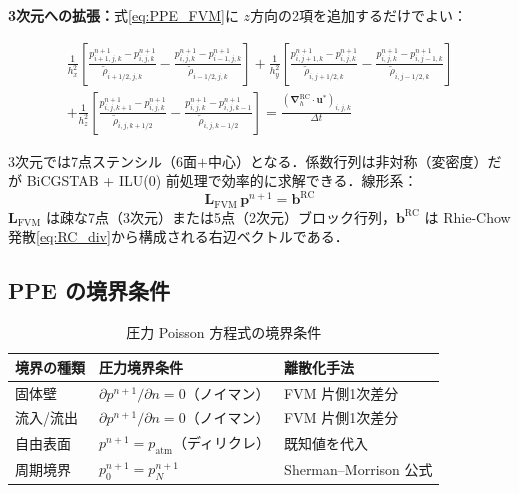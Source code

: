 \documentclass[12pt, a4paper, titlepage]{article}
\newcommand{\jp}[1]{{\normalfont\jpfont #1}}
\newcommand{\bu}{\bm{u}}
\newcommand{\bnabla}{\bm{\nabla}}
\begin{document}
\jp{\textbf{3次元への拡張：}式\eqref{eq:PPE_FVM}に $z$方向の2項を追加するだけでよい：}
\begin{tcolorbox}[mybox, title={\jp{FVM 変密度 PPE（3次元，7点ステンシル）}}]
\begin{multline}
  \frac{1}{h_x^2}\!\left[\frac{p^{n+1}_{i+1,j,k}-p^{n+1}_{i,j,k}}{\tilde\rho_{i+1/2,j,k}}-\frac{p^{n+1}_{i,j,k}-p^{n+1}_{i-1,j,k}}{\tilde\rho_{i-1/2,j,k}}\right]
  + \frac{1}{h_y^2}\!\left[\frac{p^{n+1}_{i,j+1,k}-p^{n+1}_{i,j,k}}{\tilde\rho_{i,j+1/2,k}}-\frac{p^{n+1}_{i,j,k}-p^{n+1}_{i,j-1,k}}{\tilde\rho_{i,j-1/2,k}}\right]\\
  + \frac{1}{h_z^2}\!\left[\frac{p^{n+1}_{i,j,k+1}-p^{n+1}_{i,j,k}}{\tilde\rho_{i,j,k+1/2}}-\frac{p^{n+1}_{i,j,k}-p^{n+1}_{i,j,k-1}}{\tilde\rho_{i,j,k-1/2}}\right]
  = \frac{(\bnabla_h^{\mathrm{RC}}\!\cdot\bu^*)_{i,j,k}}{\Delta t}
  \label{eq:PPE_FVM_3D}
\end{multline}
\end{tcolorbox}
\jp{3次元では7点ステンシル（6面$+$中心）となる．係数行列は非対称（変密度）だが
BiCGSTAB + ILU(0) 前処理で効率的に求解できる．線形系：}
\begin{equation}
  \bm{L}_{\mathrm{FVM}}\,\bm{p}^{n+1} = \bm{b}^{\mathrm{RC}}
  \label{eq:PPE_linear_system}
\end{equation}
\jp{$\bm{L}_{\mathrm{FVM}}$ は疎な7点（3次元）または5点（2次元）ブロック行列，$\bm{b}^{\mathrm{RC}}$ は Rhie-Chow 発散\eqref{eq:RC_div}から構成される右辺ベクトルである．}

\subsection{PPE \jp{の境界条件}}

\begin{table}[h]
\centering
\caption{\jp{圧力 Poisson 方程式の境界条件}}
\begin{tabular}{lll}
\toprule
\jp{境界の種類} & \jp{圧力境界条件} & \jp{離散化手法}\\
\midrule
\jp{固体壁} & $\partial p^{n+1}/\partial n = 0$\jp{（ノイマン）} & \jp{FVM 片側1次差分}\\
\jp{流入/流出} & $\partial p^{n+1}/\partial n = 0$\jp{（ノイマン）} & \jp{FVM 片側1次差分}\\
\jp{自由表面} & $p^{n+1} = p_{\mathrm{atm}}$\jp{（ディリクレ）} & \jp{既知値を代入}\\
\jp{周期境界} & $p^{n+1}_0 = p^{n+1}_N$ & Sherman--Morrison \jp{公式}\\
\bottomrule
\end{tabular}
\end{table}
\end{document}
